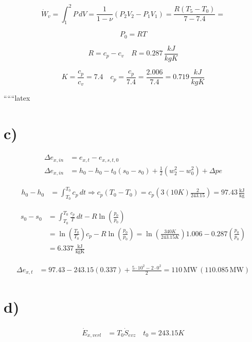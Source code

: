 \[
\dot{W}_v = \int_1^2 P \, dV = \frac{1}{1 - \nu} \left( P_2 V_2 - P_1 V_1 \right) = \frac{R \left( T_5 - T_0 \right)}{7 - 7.4} =
\]

\[
P_0 = RT
\]

\[
R = c_p - c_v \quad R = 0.287 \, \frac{kJ}{kgK}
\]

\[
K = \frac{c_p}{c_v} = 7.4 \quad c_p = \frac{c_p}{7.4} = \frac{2.006}{7.4} = 0.719 \, \frac{kJ}{kgK}
\]

``````latex


\section*{c)}

\begin{align*}
\Delta e_{x, in} &= e_{x, t} - e_{x, s, t, 0} \\
\Delta e_{x, in} &= h_0 - h_0 - t_0 (s_0 - s_0) + \frac{1}{2} \left( w_2^2 - w_0^2 \right) + \Delta p e
\end{align*}

\begin{align*}
h_0 - h_0 &= \int_{T_0}^{T_0} c_p \, dt \Rightarrow c_p (T_0 - T_0) = c_p (3(10K) \frac{2}{243.15}) = 97.43 \, \frac{\text{kJ}}{\text{kg}}
\end{align*}

\begin{align*}
s_0 - s_0 &= \int_{T_0}^{T_0} \frac{c_p}{T} \, dt - R \ln \left( \frac{p_0}{p_0} \right) \\
&= \ln \left( \frac{T_0}{T_0} \right) c_p - R \ln \left( \frac{p_0}{p_0} \right) = \ln \left( \frac{340K}{243.15K} \right) 1.006 - 0.287 \left( \frac{p_0}{p_0} \right) \\
&= 6.337 \, \frac{\text{kJ}}{\text{kgK}}
\end{align*}

\begin{align*}
\Delta e_{x, t} &= 97.43 - 243.15 (0.337) + \frac{5 \cdot 10^2 - 2 \cdot 0^2}{2} = 110 \, \text{MW} \, (110.085 \, \text{MW})
\end{align*}

\section*{d)}

\begin{align*}
\dot{E}_{x, verl} &= T_0 \dot{S}_{evz} \quad t_0 = 243.15K
\end{align*}

